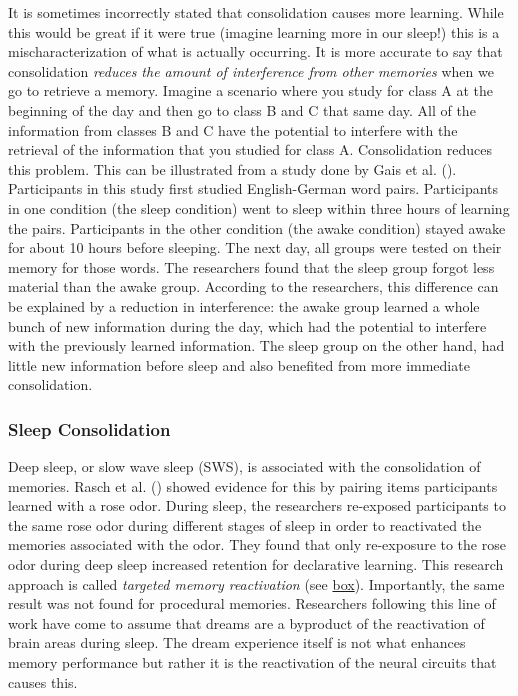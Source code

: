 \documentclass[
]{krantz}
\begin{document}
It is sometimes incorrectly stated that consolidation causes more learning. While this would be great if it were true (imagine learning more in our sleep!) this is a mischaracterization of what is actually occurring. It is more accurate to say that consolidation \emph{reduces the amount of interference from other memories} when we go to retrieve a memory. Imagine a scenario where you study for class A at the beginning of the day and then go to class B and C that same day. All of the information from classes B and C have the potential to interfere with the retrieval of the information that you studied for class A. Consolidation reduces this problem. This can be illustrated from a study done by Gais et al. (). Participants in this study first studied English-German word pairs. Participants in one condition (the sleep condition) went to sleep within three hours of learning the pairs. Participants in the other condition (the awake condition) stayed awake for about 10 hours before sleeping. The next day, all groups were tested on their memory for those words. The researchers found that the sleep group forgot less material than the awake group. According to the researchers, this difference can be explained by a reduction in interference: the awake group learned a whole bunch of new information during the day, which had the potential to interfere with the previously learned information. The sleep group on the other hand, had little new information before sleep and also benefited from more immediate consolidation.

\subsubsection*{Sleep Consolidation}\label{sleep-consolidation}


Deep sleep, or slow wave sleep (SWS), is associated with the consolidation of memories. Rasch et al. () showed evidence for this by pairing items participants learned with a rose odor. During sleep, the researchers re-exposed participants to the same rose odor during different stages of sleep in order to reactivated the memories associated with the odor. They found that only re-exposure to the rose odor during deep sleep increased retention for declarative learning. This research approach is called \emph{targeted memory reactivation} (see \hyperref[targeted-memory-reactivation]{box}). Importantly, the same result was not found for procedural memories. Researchers following this line of work have come to assume that dreams are a byproduct of the reactivation of brain areas during sleep. The dream experience itself is not what enhances memory performance but rather it is the reactivation of the neural circuits that causes this.
\end{document}
